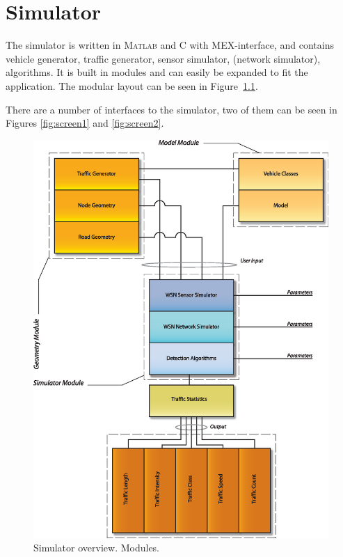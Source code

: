 \cleardoublepage\chapter{Simulator}\label{chap:simulator}
The simulator is written in \textsc{Matlab} and C with MEX-interface, and contains vehicle generator, traffic generator, sensor simulator, (network simulator), algorithms. It is built in modules and can easily be expanded to fit the application. The modular layout can be seen in Figure~\ref{fig:software}.

There are a number of interfaces to the simulator, two of them can be seen in Figures \ref{fig:screen1} and \ref{fig:screen2}.

\begin{figure}
\centering
  \begin{minipage}{1\linewidth}
  \centering
   \includegraphics[width=1\linewidth]{images/software}
  \caption[Simulator overview]{Simulator overview. Modules.}
  \label{fig:software}
  \end{minipage}
\end{figure}

